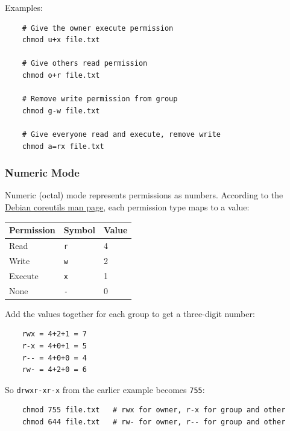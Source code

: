 \documentclass{article}
\newcommand{\code}[1]{\colorbox{codebg}{\texttt{#1}}}
\begin{document}
\vspace{0.5em}

Examples:

\begin{verbatim}
	# Give the owner execute permission
	chmod u+x file.txt
	
	# Give others read permission
	chmod o+r file.txt
	
	# Remove write permission from group
	chmod g-w file.txt
	
	# Give everyone read and execute, remove write
	chmod a=rx file.txt
\end{verbatim}

\subsubsection{Numeric Mode}

Numeric (octal) mode represents permissions as numbers. According to the
\href{https://manpages.debian.org/testing/coreutils/chmod.1.en.html}{Debian
	coreutils man page}, each permission type maps to a value:

\begin{center}
	{\renewcommand{\arraystretch}{1.25}
		\begin{tabular}{@{}lll@{}}
			\toprule
			\textbf{Permission} & \textbf{Symbol} & \textbf{Value} \\
			\midrule
			Read    & \code{r} & 4 \\
			Write   & \code{w} & 2 \\
			Execute & \code{x} & 1 \\
			None    & \code{-} & 0 \\
			\bottomrule
	\end{tabular}}
\end{center}

\vspace{0.5em}

\noindent Add the values together for each group to get a three-digit number:

\begin{verbatim}
	rwx = 4+2+1 = 7
	r-x = 4+0+1 = 5
	r-- = 4+0+0 = 4
	rw- = 4+2+0 = 6
\end{verbatim}

So \code{drwxr-xr-x} from the earlier example becomes \code{755}:

\begin{verbatim}
	chmod 755 file.txt   # rwx for owner, r-x for group and other
	chmod 644 file.txt   # rw- for owner, r-- for group and other
\end{verbatim}
\end{document}
